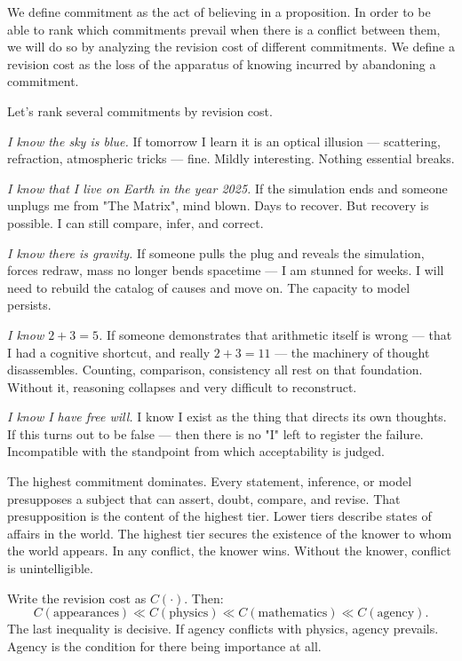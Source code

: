 We define commitment as the act of believing in a proposition. In order to be able to rank which commitments prevail when there is a conflict between them, we will do so by analyzing the revision cost of different commitments. We define a revision cost as the loss of the apparatus of knowing incurred by abandoning a commitment.

Let's rank several commitments by revision cost.

\medskip

\textit{I know the sky is blue.} If tomorrow I learn it is an optical illusion — scattering, refraction, atmospheric tricks — fine. Mildly interesting. Nothing essential breaks.

\textit{I know that I live on Earth in the year 2025.} If the simulation ends and someone unplugs me from "The Matrix", mind blown. Days to recover. But recovery is possible. I can still compare, infer, and correct.

\textit{I know there is gravity.} If someone pulls the plug and reveals the simulation, forces redraw, mass no longer bends spacetime — I am stunned for weeks. I will need to rebuild the catalog of causes and move on. The capacity to model persists.

\textit{I know $2+3=5$.} If someone demonstrates that arithmetic itself is wrong — that I had a cognitive shortcut, and really $2+3=11$ — the machinery of thought disassembles. Counting, comparison, consistency all rest on that foundation. Without it, reasoning collapses and very difficult to reconstruct.

\textit{I know I have free will.} I know I exist as the thing that directs its own thoughts. If this turns out to be false — then there is no "I" left to register the failure. Incompatible with the standpoint from which acceptability is judged.

\medskip

The highest commitment dominates. Every statement, inference, or model presupposes a subject that can assert, doubt, compare, and revise. That presupposition is the content of the highest tier. Lower tiers describe states of affairs in the world. The highest tier secures the existence of the knower to whom the world appears. In any conflict, the knower wins. Without the knower, conflict is unintelligible.

Write the revision cost as $C(\cdot)$. Then:
\[
C(\text{appearances}) \ll C(\text{physics}) \ll C(\text{mathematics}) \ll C(\text{agency}).
\]
The last inequality is decisive. If agency conflicts with physics, agency prevails. Agency is the condition for there being importance at all.

